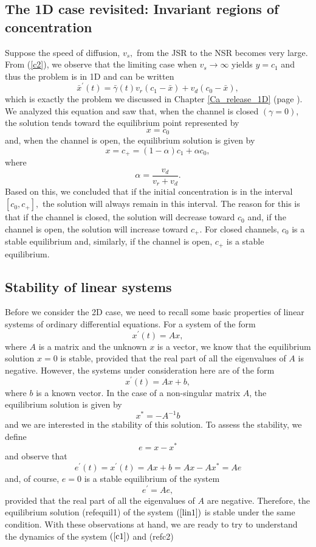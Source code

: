 \subsection{The 1D case revisited: Invariant regions of concentration}

Suppose the speed of diffusion, $v_{s},$ from the JSR to the NSR becomes very large.
From (\ref{c2}), we observe that the limiting case when $v_{s}\rightarrow
\infty$ yields $y=c_{1}$ and thus the problem is in 1D and can be written
\[
\bar{x}^{\prime}(t)=\bar{\gamma}(t)v_{r}\left(  c_{1}-\bar{x}\right)
+v_{d}\left(  c_{0}-\bar{x}\right)  ,
\]
which is exactly the problem we discussed in Chapter \ref{Ca_release_1D} (page \pageref{stoch}). 
We analyzed this equation and saw that, when the channel is closed
$(\gamma=0)$, the solution tends toward the equilibrium point represented by
\[
x=c_{0}
\]
and, when the channel is open, the equilibrium solution is given by
\[
x=c_{+}=\left(  1-\alpha\right)  c_{1}+\alpha c_{0},
\]
where
\[
\alpha=\frac{v_{d}}{v_{r}+v_{d}}.
\]
Based on this, we concluded that if the initial concentration is in the
interval $\left[  c_{0},c_{+}\right]  ,$ the solution will always remain in
this interval. The reason for this is that if the channel is closed, the
solution will decrease toward $c_{0}$ and, if the channel is open, the
solution will increase toward $c_{+}.$ For closed channels, $c_{0}$ is a
stable equilibrium and, similarly, if the channel is open, $c_{+}$ is a stable equilibrium.

\subsection{Stability of linear systems}

Before we consider the 2D case, we need to recall some basic properties of
linear systems of ordinary differential equations. For a system of the form
\[
x^{\prime}(t)=Ax,
\]
where $A$ is a matrix and the unknown $x$ is a vector, we know that the
equilibrium solution $x=0$ is stable, provided that the real part of all the
eigenvalues of $A$ is negative. However, the systems under consideration here
are of the form
\begin{equation}
x^{\prime}(t)=Ax+b, \label{lin1}
\end{equation}
where $b$ is a known vector. In the case of a non-singular matrix $A$, the
equilibrium solution is given by
\begin{equation}
x^{\ast}=-A^{-1}b \label{equil1}
\end{equation}
and we are interested in the stability of this solution. To assess
the stability, we define
\[
e=x-x^{\ast}
\]
and observe that
\[
e^{\prime}(t)=x^{\prime}(t)=Ax+b=Ax-Ax^{\ast}=Ae
\]
and, of course, $e=0$ is a stable equilibrium of the system
\[
e^{\prime}=Ae,
\]
provided that the real part of all the eigenvalues of $A$ are negative. 
Therefore,
the equilibrium solution (ref{equil1}) of the system $\left(
\ref{lin1}\right)  $ is stable under the same condition. With these observations
at hand, we are ready to try to understand the dynamics of the system $\left(
\ref{c1}\right)$ and (ref{c2})

